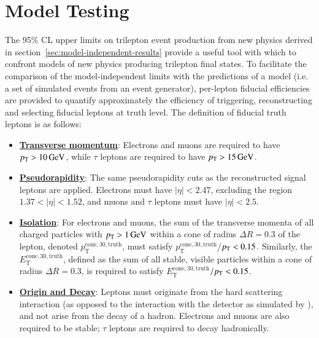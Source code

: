 \section{Model Testing}\label{sec:model-independent-model-testing}
The 95\% CL upper limits on trilepton event production from new physics derived in section~\ref{sec:model-independent-results} provide a useful tool with which to confront models of new physics producing trilepton final states. To facilitate the comparison of the model-independent limits with the predictions of a model (i.e. a set of simulated events from an event generator), per-lepton fiducial efficiencies are provided to quantify approximately the efficiency of triggering, reconstructing and selecting fiducial leptons at truth level. The definition of fiducial truth leptons is as follows: 

\begin{itemize}
	\item \underline{\textbf{Transverse momentum}}: Electrons and muons are required to have $p_{\text{T}}>\SI{10}{\giga\electronvolt}$, while $\tau$ leptons are required to have $p_{\text{T}}>\SI{15}{\giga\electronvolt}$.
	\item \underline{\textbf{Pseudorapidity}}: The same pseudorapidity cuts as the reconstructed signal leptons are applied. Electrons must have $|\eta|<2.47$, excluding the region $1.37<|\eta|<1.52$, and muons and $\tau$ leptons must have $|\eta|<2.5$.
	\item \underline{\textbf{Isolation}}: For electrons and muons, the sum of the transverse momenta of all charged particles with $p_{\text{T}}>\SI{1}{\giga\electronvolt}$ within a cone of radius $\Delta R=0.3$ of the lepton, denoted $p_{\mathrm{T}}^{\mathrm{cone},30,\mathrm{truth}}$, must satisfy $p_{\mathrm{T}}^{\mathrm{cone},30,\mathrm{truth}}$/$p_{\text{T}}<0.15$. Similarly, the $E_{\mathrm{T}}^{\mathrm{cone},30,\mathrm{truth}}$, defined as the sum of all stable, visible particles within a cone of radius $\Delta R=0.3$, is required to satisfy $E_{\mathrm{T}}^{\mathrm{cone},30,\mathrm{truth}}$$/p_{\text{T}}<0.15$.
	\item \underline{\textbf{Origin and Decay}}: Leptons must originate from the hard scattering interaction (as opposed to the interaction with the detector as simulated by \geant), and not arise from the decay of a hadron. Electrons and muons are also required to be stable; $\tau$ leptons are required to decay hadronically. 
\end{itemize}

